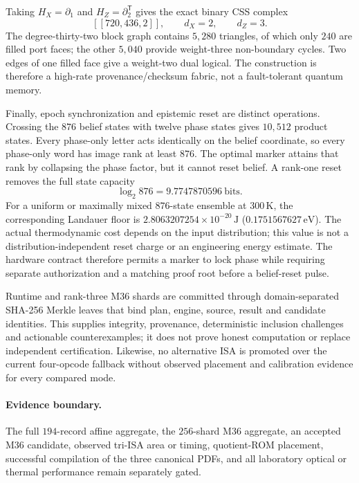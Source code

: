 Taking $H_X=\partial_1$ and $H_Z=\partial_2^{\mathsf T}$ gives the exact binary CSS complex
\[
 [[720,436,2]],\qquad d_X=2,\qquad d_Z=3.
\]
The degree-thirty-two block graph contains $5{,}280$ triangles, of which only $240$ are filled
port faces; the other $5{,}040$ provide weight-three non-boundary cycles.  Two edges of one
filled face give a weight-two dual logical.  The construction is therefore a high-rate
provenance/checksum fabric, not a fault-tolerant quantum memory.

Finally, epoch synchronization and epistemic reset are distinct operations.  Crossing the
$876$ belief states with twelve phase states gives $10{,}512$ product states.  Every phase-only
letter acts identically on the belief coordinate, so every phase-only word has image rank at least
$876$.  The optimal marker attains that rank by collapsing the phase factor, but it cannot reset
belief.  A rank-one reset removes the full state capacity
\[
 \log_2 876=9.7747870596\ \text{bits}.
\]
For a uniform or maximally mixed $876$-state ensemble at $300\,\mathrm K$, the corresponding
Landauer floor is $2.8063207254\times10^{-20}\,\mathrm J$
($0.1751567627\,\mathrm{eV}$).  The actual thermodynamic cost depends on the input distribution;
this value is not a distribution-independent reset charge or an engineering energy estimate.  The
hardware contract therefore permits a marker to lock phase while requiring separate authorization
and a matching proof root before a belief-reset pulse.

Runtime and rank-three M36 shards are committed through domain-separated SHA-256 Merkle leaves
that bind plan, engine, source, result and candidate identities.  This supplies integrity,
provenance, deterministic inclusion challenges and actionable counterexamples; it does not prove
honest computation or replace independent certification.  Likewise, no alternative ISA is
promoted over the current four-opcode fallback without observed placement and calibration evidence
for every compared mode.

\paragraph{Evidence boundary.}
The full $194$-record affine aggregate, the $256$-shard M36 aggregate, an accepted M36 candidate,
observed tri-ISA area or timing, quotient-ROM placement, successful compilation of the three
canonical PDFs, and all laboratory optical or thermal performance remain separately gated.
